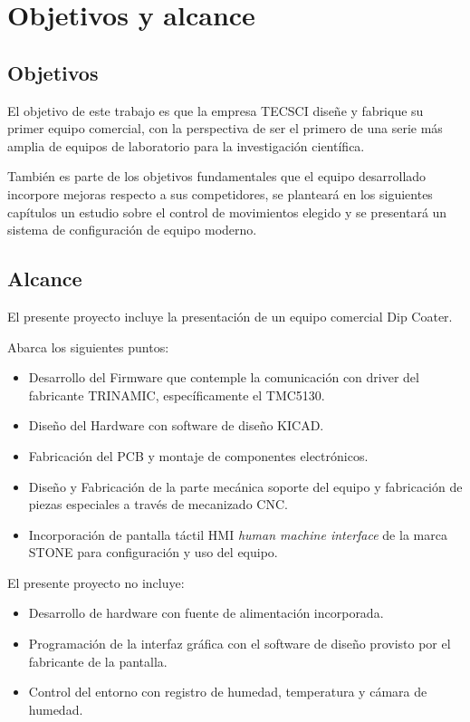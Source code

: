 
\section{Objetivos y alcance}

\subsection{Objetivos}

El objetivo de este trabajo es que la empresa TECSCI diseñe y fabrique su primer equipo comercial, con la perspectiva de ser el primero de una serie más amplia de equipos de laboratorio para la investigación científica.

También es parte de los objetivos fundamentales que el equipo desarrollado incorpore mejoras respecto a sus competidores, se planteará en los siguientes capítulos un estudio sobre el control de movimientos elegido y se presentará un sistema de configuración de equipo moderno. 

\subsection{Alcance}

El presente proyecto incluye la presentación de un equipo comercial Dip Coater. 

Abarca los siguientes puntos:

\begin{itemize}
\item Desarrollo del Firmware que contemple la comunicación con driver del fabricante TRINAMIC, específicamente el TMC5130.
\item Diseño del Hardware con software de diseño KICAD.
\item Fabricación del PCB y montaje de componentes electrónicos.
\item Diseño y Fabricación de la parte mecánica soporte del equipo y fabricación de piezas especiales a través de mecanizado CNC.
\item Incorporación de pantalla táctil HMI \textit{human machine interface} de la marca STONE para configuración y uso del equipo.
\end{itemize}



El presente proyecto no incluye:

\begin{itemize}
\item Desarrollo de hardware con fuente de alimentación incorporada.
\item Programación de la interfaz gráfica con el software de diseño provisto por el fabricante de la pantalla.
\item Control del entorno con registro de humedad, temperatura y  cámara de humedad.
\end{itemize}


